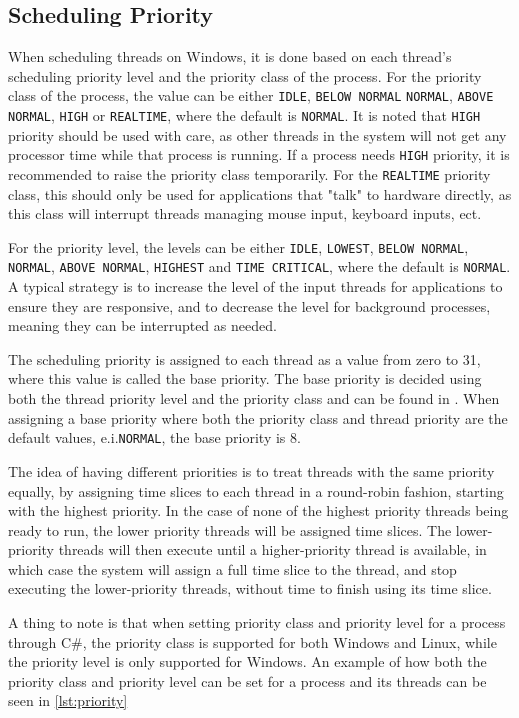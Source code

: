 \subsection{Scheduling Priority}\label{subsec:scheduling}

When scheduling threads on Windows, it is done based on each thread's scheduling priority level and the priority class of the process.  For the priority class of the process, the value can be either \texttt{IDLE}, \texttt{BELOW NORMAL} \texttt{NORMAL}, \texttt{ABOVE NORMAL}, \texttt{HIGH} or \texttt{REALTIME}, where the default is \texttt{NORMAL}. It is noted that \texttt{HIGH} priority should be used with care, as other threads in the system will not get any processor time while that process is running. If a process needs \texttt{HIGH} priority, it is recommended to raise the priority class temporarily. For the \texttt{REALTIME} priority class, this should only be used for applications that "talk" to hardware directly, as this class will interrupt threads managing mouse input, keyboard inputs, ect.\cite{priority}\newline

For the priority level, the levels can be either \texttt{IDLE}, \texttt{LOWEST}, \texttt{BELOW NORMAL}, \texttt{NORMAL}, \texttt{ABOVE NORMAL}, \texttt{HIGHEST} and \texttt{TIME CRITICAL}, where the default is \texttt{NORMAL}. A typical strategy is to increase the level of the input threads for applications to ensure they are responsive, and to decrease the level for background processes, meaning they can be interrupted as needed.\cite{priority}

The scheduling priority is assigned to each thread as a value from zero to 31, where this value is called the base priority. The base priority is decided using both the thread priority level and the priority class and can be found in \cite{priority}. When assigning a base priority where both the priority class and thread priority are the default values, e.i.\texttt{NORMAL}, the base priority is $8$.\cite{priority}\newline

The idea of having different priorities is to treat threads with the same priority equally, by assigning time slices to each thread in a round-robin fashion, starting with the highest priority. In the case of none of the highest priority threads being ready to run, the lower priority threads will be assigned time slices. The lower-priority threads will then execute until a higher-priority thread is available, in which case the system will assign a full time slice to the thread, and stop executing the lower-priority threads, without time to finish using its time slice.\cite{priority}



A thing to note is that when setting priority class and priority level for a process through C\#, the priority class is supported for both Windows and Linux, while the priority level is only supported for Windows. An example of how both the priority class and priority level can be set for a process and its threads can be seen in \cref{lst:priority}


